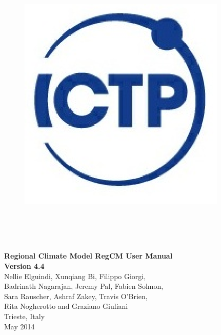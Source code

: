 \documentclass[10pt,twoside,a4paper]{report}
\begin{document}
\begin{titlepage}

\begin{figure}
\vspace{-35pt}
\begin{center}
\includegraphics{ICTP_logo}
\end{center}
\end{figure}

\\
 \\
 \\

\vspace{3cm}

\begin{boxedminipage}{\textwidth}
\begin{center}
\vspace{0.5cm}
{\Large
{\bf Regional Climate Model RegCM User Manual} \\
\vspace{0.2cm}
{\bf Version 4.4}}\\
\vspace{0.5cm}
Nellie Elguindi, Xunqiang Bi, Filippo Giorgi,\\
Badrinath Nagarajan, Jeremy Pal, Fabien Solmon,\\
Sara Rauscher, Ashraf Zakey, Travis O'Brien,\\
Rita Nogherotto and Graziano Giuliani\\
Trieste, Italy\\May 2014
\vspace{0.5cm}
\end{center}
\end{boxedminipage}

\end{titlepage}

\cleardoublepage

\cleardoublepage
\tableofcontents
\cleardoublepage

\listoffigures
\listoftables
\cleardoublepage













\end{document}
